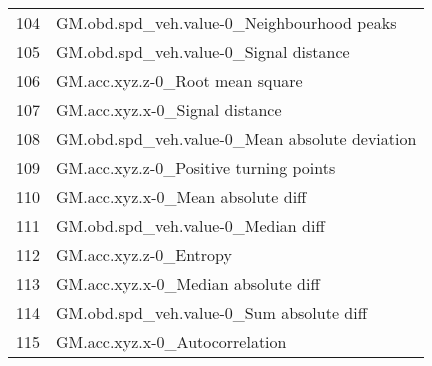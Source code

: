 \begin{tabular}{ll}
104 &        GM.obd.spd\_veh.value-0\_Neighbourhood peaks \\
105 &            GM.obd.spd\_veh.value-0\_Signal distance \\
106 &                   GM.acc.xyz.z-0\_Root mean square \\
107 &                    GM.acc.xyz.x-0\_Signal distance \\
108 &    GM.obd.spd\_veh.value-0\_Mean absolute deviation \\
109 &            GM.acc.xyz.z-0\_Positive turning points \\
110 &                 GM.acc.xyz.x-0\_Mean absolute diff \\
111 &                GM.obd.spd\_veh.value-0\_Median diff \\
112 &                            GM.acc.xyz.z-0\_Entropy \\
113 &               GM.acc.xyz.x-0\_Median absolute diff \\
114 &          GM.obd.spd\_veh.value-0\_Sum absolute diff \\
115 &                    GM.acc.xyz.x-0\_Autocorrelation \\
\bottomrule
\end{tabular}

